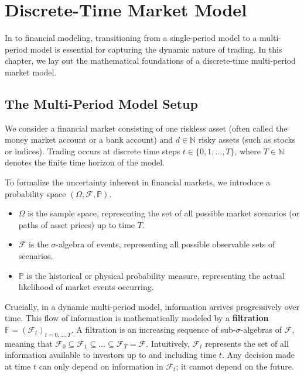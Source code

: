 \chapter{Discrete-Time Market Model}
\label{chap:discrete_time_market_model}

In to financial modeling, transitioning from a single-period model to a multi-period model is essential for capturing the dynamic nature of trading. In this chapter, we lay out the mathematical foundations of a discrete-time multi-period market model.

\section{The Multi-Period Model Setup}

We consider a financial market consisting of one riskless asset (often called the money market account or a bank account) and $d \in \mathbb{N}$ risky assets (such as stocks or indices). Trading occurs at discrete time steps $t \in \{0, 1, \dots, T\}$, where $T \in \mathbb{N}$ denotes the finite time horizon of the model.

To formalize the uncertainty inherent in financial markets, we introduce a probability space $(\Omega, \mathcal{F}, \mathbb{P})$. 
\begin{itemize}
    \item $\Omega$ is the sample space, representing the set of all possible market scenarios (or paths of asset prices) up to time $T$.
    \item $\mathcal{F}$ is the $\sigma$-algebra of events, representing all possible observable sets of scenarios.
    \item $\mathbb{P}$ is the historical or physical probability measure, representing the actual likelihood of market events occurring.
\end{itemize}

Crucially, in a dynamic multi-period model, information arrives progressively over time. This flow of information is mathematically modeled by a \textbf{filtration} $\mathbb{F} = (\mathcal{F}_t)_{t=0, \dots, T}$. 
A filtration is an increasing sequence of sub-$\sigma$-algebras of $\mathcal{F}$, meaning that $\mathcal{F}_0 \subseteq \mathcal{F}_1 \subseteq \dots \subseteq \mathcal{F}_T = \mathcal{F}$. Intuitively, $\mathcal{F}_t$ represents the set of all information available to investors up to and including time $t$. Any decision made at time $t$ can only depend on information in $\mathcal{F}_t$; it cannot depend on the future.


